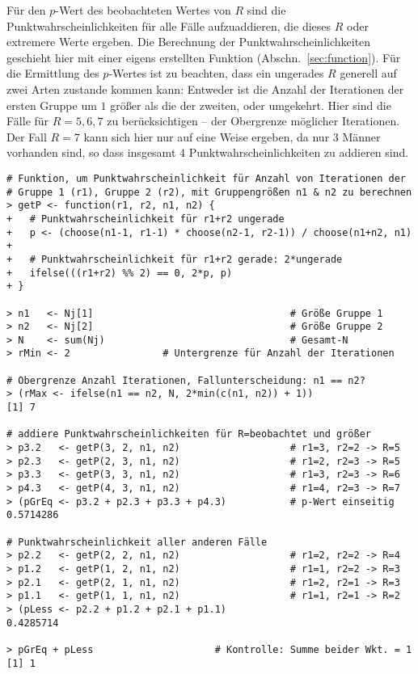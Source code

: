 Für den $p$-Wert des beobachteten Wertes von $R$ sind die Punktwahrscheinlichkeiten für alle Fälle aufzuaddieren, die dieses $R$ oder extremere Werte ergeben. Die Berechnung der Punktwahrscheinlichkeiten geschieht hier mit einer eigens erstellten Funktion (Abschn.\ \ref{sec:function}). Für die Ermittlung des $p$-Wertes ist zu beachten, dass ein ungerades $R$ generell auf zwei Arten zustande kommen kann: Entweder ist die Anzahl der Iterationen der ersten Gruppe um $1$ größer als die der zweiten, oder umgekehrt. Hier sind die Fälle für $R = 5, 6, 7$ zu berücksichtigen -- der Obergrenze möglicher Iterationen. Der Fall $R = 7$ kann sich hier nur auf eine Weise ergeben, da nur $3$ Männer vorhanden sind, so dass insgesamt $4$ Punktwahrscheinlichkeiten zu addieren sind.
\begin{lstlisting}
# Funktion, um Punktwahrscheinlichkeit für Anzahl von Iterationen der
# Gruppe 1 (r1), Gruppe 2 (r2), mit Gruppengrößen n1 & n2 zu berechnen
> getP <- function(r1, r2, n1, n2) {
+   # Punktwahrscheinlichkeit für r1+r2 ungerade
+   p <- (choose(n1-1, r1-1) * choose(n2-1, r2-1)) / choose(n1+n2, n1)
+
+   # Punktwahrscheinlichkeit für r1+r2 gerade: 2*ungerade
+   ifelse(((r1+r2) %% 2) == 0, 2*p, p)
+ }

> n1   <- Nj[1]                                  # Größe Gruppe 1
> n2   <- Nj[2]                                  # Größe Gruppe 2
> N    <- sum(Nj)                                # Gesamt-N
> rMin <- 2                # Untergrenze für Anzahl der Iterationen

# Obergrenze Anzahl Iterationen, Fallunterscheidung: n1 == n2?
> (rMax <- ifelse(n1 == n2, N, 2*min(c(n1, n2)) + 1))
[1] 7

# addiere Punktwahrscheinlichkeiten für R=beobachtet und größer
> p3.2   <- getP(3, 2, n1, n2)                   # r1=3, r2=2 -> R=5
> p2.3   <- getP(2, 3, n1, n2)                   # r1=2, r2=3 -> R=5
> p3.3   <- getP(3, 3, n1, n2)                   # r1=3, r2=3 -> R=6
> p4.3   <- getP(4, 3, n1, n2)                   # r1=4, r2=3 -> R=7
> (pGrEq <- p3.2 + p2.3 + p3.3 + p4.3)           # p-Wert einseitig
0.5714286

# Punktwahrscheinlichkeit aller anderen Fälle
> p2.2   <- getP(2, 2, n1, n2)                   # r1=2, r2=2 -> R=4
> p1.2   <- getP(1, 2, n1, n2)                   # r1=1, r2=2 -> R=3
> p2.1   <- getP(2, 1, n1, n2)                   # r1=2, r2=1 -> R=3
> p1.1   <- getP(1, 1, n1, n2)                   # r1=1, r2=1 -> R=2
> (pLess <- p2.2 + p1.2 + p2.1 + p1.1)
0.4285714

> pGrEq + pLess                     # Kontrolle: Summe beider Wkt. = 1
[1] 1
\end{lstlisting}

